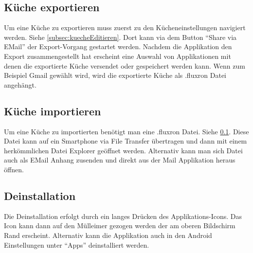 \subsection{Küche exportieren}
\label{subsec:kuecheExportieren}
Um eine Küche zu exportieren muss zuerst zu den Kücheneinstellungen navigiert werden. Siehe \ref{subsec:kuecheEditieren}. Dort kann via dem Button \enquote{Share via EMail} der Export-Vorgang gestartet werden. Nachdem die Applikation den Export zusammengestellt hat erscheint eine Auswahl von Applikationen mit denen die exportierte Küche versendet oder gespeichert werden kann. Wenn zum Beispiel Gmail gewählt wird, wird die exportierte Küche als .fluxron Datei angehängt. 

\subsection{Küche importieren}
Um eine Küche zu importierten benötigt man eine .fluxron Datei. Siehe \ref{subsec:kuecheExportieren}. Diese Datei kann auf ein Smartphone via File Transfer übertragen und dann mit einem herkömmlichen Datei Explorer geöffnet werden. Alternativ kann man sich Datei auch als EMail Anhang zusenden und direkt aus der Mail Applikation heraus öffnen.

\subsection{Deinstallation}
Die Deinstallation erfolgt durch ein langes Drücken des Applikations-Icons. Das Icon kann dann auf den Mülleimer gezogen werden der am oberen Bildschirm Rand erscheint. Alternativ kann die Applikation auch in den Android Einstellungen unter \enquote{Apps} deinstalliert werden.